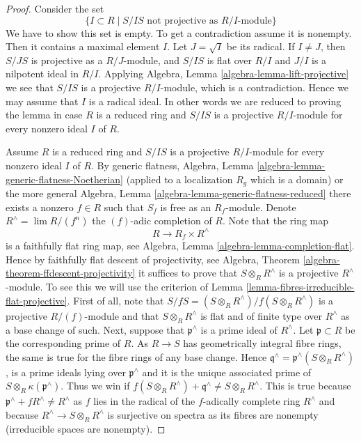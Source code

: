 \begin{proof}
Consider the set
$$
\{I \subset R \mid S/IS\text{ not projective as }R/I\text{-module}\}
$$
We have to show this set is empty. To get a contradiction assume it is
nonempty. Then it contains a maximal element $I$.
Let $J = \sqrt{I}$ be its radical. If $I \not = J$, then
$S/JS$ is projective as a $R/J$-module, and $S/IS$ is flat over $R/I$
and $J/I$ is a nilpotent ideal in $R/I$. Applying
Algebra, Lemma \ref{algebra-lemma-lift-projective}
we see that $S/IS$ is a projective $R/I$-module, which is a contradiction.
Hence we may assume that $I$ is a radical ideal. In other words we
are reduced to proving the lemma in case $R$ is a reduced ring and
$S/IS$ is a projective $R/I$-module for every nonzero ideal $I$
of $R$.

\medskip\noindent
Assume $R$ is a reduced ring and $S/IS$ is a projective $R/I$-module
for every nonzero ideal $I$ of $R$. By generic flatness,
Algebra, Lemma \ref{algebra-lemma-generic-flatness-Noetherian}
(applied to a localization $R_g$ which is a domain) or the more general
Algebra, Lemma \ref{algebra-lemma-generic-flatness-reduced}
there exists a nonzero $f \in R$ such that $S_f$ is free as an
$R_f$-module. Denote $R^\wedge = \lim R/(f^n)$ the $(f)$-adic completion
of $R$. Note that the ring map
$$
R \longrightarrow R_f \times R^\wedge
$$
is a faithfully flat ring map, see
Algebra, Lemma \ref{algebra-lemma-completion-flat}.
Hence by faithfully flat descent of projectivity, see
Algebra, Theorem \ref{algebra-theorem-ffdescent-projectivity}
it suffices to prove that $S \otimes_R R^\wedge$ is a projective
$R^\wedge$-module. To see this we will use the criterion of
Lemma \ref{lemma-fibres-irreducible-flat-projective}.
First of all, note that $S/fS = (S \otimes_R R^\wedge)/f(S \otimes_R R^\wedge)$
is a projective $R/(f)$-module and that $S \otimes_R R^\wedge$ is flat
and of finite type over $R^\wedge$ as a base change of such.
Next, suppose that $\mathfrak p^\wedge$ is a prime ideal
of $R^\wedge$. Let $\mathfrak p \subset R$ be the corresponding prime
of $R$. As $R \to S$ has geometrically integral fibre rings, the
same is true for the fibre rings of any base change. Hence
$\mathfrak q^\wedge = \mathfrak p^\wedge(S \otimes_R R^\wedge)$,
is a prime ideals lying over $\mathfrak p^\wedge$
and it is the unique associated prime of
$S \otimes_R \kappa(\mathfrak p^\wedge)$. Thus we win if
$f(S \otimes_R R^\wedge) + \mathfrak q^\wedge \not = S \otimes_R R^\wedge$.
This is true because $\mathfrak p^\wedge + fR^\wedge \not = R^\wedge$
as $f$ lies in the radical of the $f$-adically complete ring $R^\wedge$
and because $R^\wedge \to S \otimes_R R^\wedge$ is surjective on spectra
as its fibres are nonempty (irreducible spaces are nonempty).
\end{proof}


